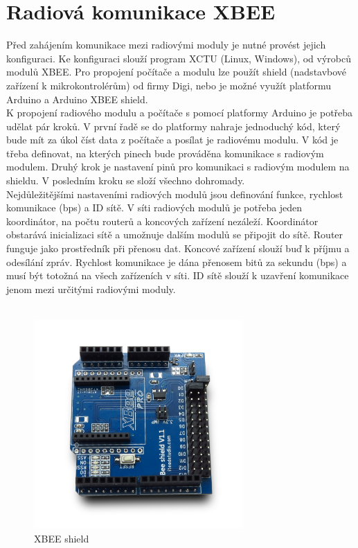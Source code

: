 \section{Radiová komunikace XBEE}
Před zahájením komunikace mezi radiovými moduly je nutné provést jejich konfiguraci. Ke konfiguraci slouží program XCTU (Linux, Windows), od výrobců modulů XBEE. Pro propojení počítače a modulu lze použít shield (nadstavbové zařízení k mikrokontrolérům) od firmy Digi, nebo je možné využít platformu Arduino a Arduino XBEE shield.\\
K propojení radiového modulu a počítače s pomocí platformy Arduino je potřeba udělat pár kroků. V první řadě se do platformy nahraje jednoduchý kód, který bude mít za úkol číst data z počítače a posílat je radiovému modulu. V kód je třeba definovat, na kterých pinech bude prováděna komunikace s radiovým modulem. Druhý krok je nastavení pinů pro komunikaci s radiovým modulem na shieldu. V posledním kroku se složí všechno dohromady.\\
Nejdůležitějšími nastaveními radiových modulů jsou definování funkce, rychlost komunikace (bps) a ID sítě. V síti radiových modulů je potřeba jeden koordinátor, na počtu routerů a koncových zařízení nezáleží. Koordinátor obstarává inicializaci sítě a umožnuje dalším modulů se připojit do sítě. Router funguje jako prostředník při přenosu dat. Koncové zařízení slouží buď k příjmu a odesílání zpráv. Rychlost komunikace je dána přenosem bitů za sekundu (bps) a musí být totožná na všech zařízeních v síti. ID sítě slouží k uzavření komunikace jenom mezi určitými radiovými moduly. \cite{xbeetut}\\\\

\begin{figure}[H]
	\centering
	\includegraphics[width=8cm]{pictures/xbeeshield.jpg}
	\caption{XBEE shield}
\end{figure}


